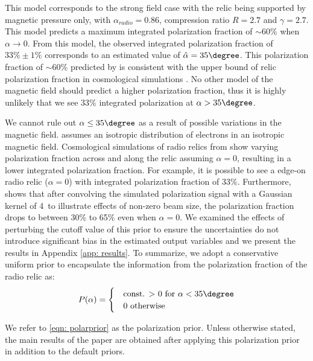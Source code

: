 This model corresponds to the strong field case with the relic being supported by
magnetic pressure only, with $\alpha_{radio} = 0.86$, compression ratio
$R=2.7$ and $\gamma = 2.7$. 
This model predicts a maximum integrated polarization fraction of
$\sim60\%$ when $\alpha \rightarrow 0$. From this model, the observed integrated
polarization fraction of $33\%\pm1\%$ corresponds to an estimated value
of $\hat{\alpha}
 = 35\degree$. 
This  polarization fraction of $\sim60\%$ predicted by \citep{E98} is
consistent with the upper bound of relic polarization fraction in cosmological
simulations \citep{S13}. No other model of the magnetic field should predict a higher polarization fraction, thus it is highly unlikely that we see 33\%
integrated polarization at $\alpha > 35\degree$.  
\par

We cannot rule out $\alpha \leq 35\degree$ as a result of possible
variations in the magnetic field. 
\cite{E98} assumes an isotropic distribution of electrons in an isotropic magnetic field. Cosmological
simulations of radio relics from \cite{S13} show varying polarization
fraction across and along the relic assuming $\alpha = 0$, resulting in a
lower integrated polarization fraction. For example, it is possible to see a edge-on radio relic ($\alpha = 0$) with integrated polarization fraction of 33\%. 
Furthermore, \cite{S13} shows that after convolving the
simulated polarization signal with a Gaussian kernel of 4\arcmin~to
illustrate effects of non-zero beam size, the polarization fraction drops to between 30\% to
65\% even when $\alpha = 0$. We examined the effects of perturbing
the cutoff value of this prior to ensure the uncertainties do not
introduce significant bias in the estimated output variables and we
present the results in Appendix \ref{app: results}.
To summarize, we adopt a conservative uniform prior to encapsulate the
information from the polarization fraction of the radio relic as:
\begin{equation}
P(\alpha) = 
	\begin{cases}
	& \text{const. $>$ 0 for  }\alpha < 35 \degree \\ 
	& 0 \text{ otherwise}\label{eqn: polarprior}
	\end{cases}
\end{equation}

We refer to \ref{eqn: polarprior} as the polarization prior. Unless
otherwise stated, the main results of the paper are obtained after applying
this polarization prior in addition to the default priors.

